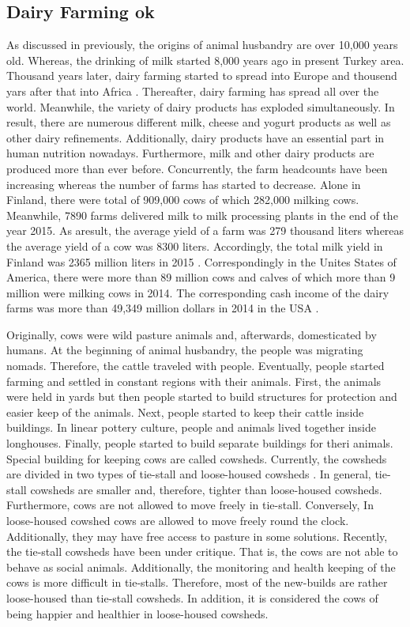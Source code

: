 \documentclass[english,12pt,a4paper,pdftex,elec,utf8]{aaltothesis}
\begin{document}
\subsection{Dairy Farming ok} \label{dairyfarmingsection}

As discussed in previously, the origins of animal husbandry are over 10,000 years old. Whereas, the drinking of milk started 8,000 years ago in present Turkey area. Thousand years later, dairy farming started to spread into Europe and thousend yars after that into Africa \cite{ancienthistoryofmilk}. Thereafter, dairy farming has spread all over the world. Meanwhile, the variety of dairy products has exploded simultaneously. In result, there are numerous different milk, cheese and yogurt products as well as other dairy refinements. Additionally, dairy products have an essential part in human nutrition nowadays. Furthermore, milk and other dairy products are produced more than ever before. Concurrently, the farm headcounts have been increasing whereas the number of farms has started to decrease. Alone in Finland, there were total of 909,000 cows of which 282,000 milking cows. Meanwhile, 7890 farms delivered milk to milk processing plants in the end of the year 2015. As aresult, the average yield of a farm was 279 thousand liters whereas the average yield of a cow was 8300 liters. Accordingly, the total milk yield in Finland was 2365 million liters in 2015 \cite{ruokajaluonnonvaratilastot2016}. Correspondingly in the Unites States of America, there were more than 89 million cows and calves of which more than 9 million were milking cows in 2014. The corresponding cash income of the dairy farms was more than 49,349 million dollars in 2014 in the USA \cite{agriculturalstatistics2015}.


Originally, cows were wild pasture animals and, afterwards,  domesticated by humans. At the beginning of animal husbandry, the people was migrating nomads. Therefore, the cattle traveled with people. Eventually, people started farming and settled in constant regions with their animals. First, the animals were held in yards but then people started to build structures for protection and easier keep of the animals. Next, people started to keep their cattle inside buildings. In linear pottery culture, people and animals lived together inside longhouses. Finally, people started to build separate buildings for theri animals. Special building for keeping cows are called cowsheds. Currently, the cowsheds are divided in two types of tie-stall and loose-housed cowsheds \cite{lehmahavaintoja}. In general, tie-stall cowsheds are smaller and, therefore,  tighter than loose-housed cowsheds. Furthermore, cows are not allowed to move freely in tie-stall. Conversely, In loose-housed cowshed cows are allowed to move freely round the clock. Additionally, they may have free access to pasture in some solutions. Recently, the tie-stall cowsheds have been under critique. That is, the cows are not able to behave as social animals. Additionally, the monitoring and health keeping of the cows is more difficult in tie-stalls. Therefore, most of the new-builds are rather loose-housed than tie-stall cowsheds. In addition, it is considered the cows of being happier and healthier in loose-housed cowsheds. 
\end{document}
